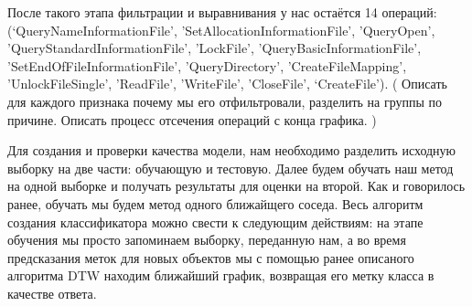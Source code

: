После такого этапа фильтрации и выравнивания у нас остаётся 14 операций: (‘QueryNameInformationFile', 'SetAllocationInformationFile', 'QueryOpen', 'QueryStandardInformationFile', 'LockFile', 'QueryBasicInformationFile', 'SetEndOfFileInformationFile', 'QueryDirectory', 'CreateFileMapping', 'UnlockFileSingle', 'ReadFile', 'WriteFile', 'CloseFile', ‘CreateFile’). ( Описать для каждого признака почему мы его отфильтровали, разделить на группы по причине. Описать процесс отсечения операций с конца графика. )

Для создания и проверки качества модели, нам необходимо разделить исходную выборку на две части: обучающую и тестовую. Далее будем обучать наш метод на одной выборке и получать результаты для оценки на второй. Как и говорилось ранее, обучать мы будем метод одного ближайщего соседа. Весь алгоритм создания классификатора можно свести к следующим действиям: на этапе обучения мы просто запоминаем выборку, переданную нам, а во время предсказания меток для новых объектов мы с помощью ранее описаного алгоритма DTW находим ближайший график, возвращая его метку класса в качестве ответа.

